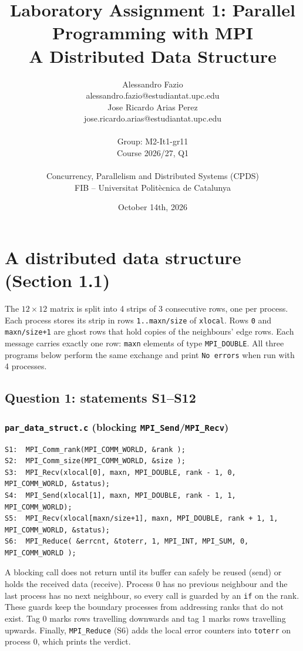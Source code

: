 \documentclass[11pt,a4paper]{article}
\title{Laboratory Assignment 1: Parallel Programming with MPI \\ A Distributed Data Structure}
\author{
  Alessandro Fazio \\
  alessandro.fazio@estudiantat.upc.edu \\
  Jose Ricardo Arias Perez \\
  jose.ricardo.arias@estudiantat.upc.edu \\\\
  Group: M2-It1-gr11 \\
  Course 2026/27, Q1 \\\\
  Concurrency, Parallelism and Distributed Systems (CPDS) \\
  FIB -- Universitat Polit\`ecnica de Catalunya
}
\date{October 14th, 2026}
\begin{document}
\maketitle
\thispagestyle{empty}
\newpage

\section{A distributed data structure (Section 1.1)}

The $12 \times 12$ matrix is split into 4 strips of 3 consecutive rows, one per process. Each process stores its strip in rows \texttt{1..maxn/size} of \texttt{xlocal}. Rows \texttt{0} and \texttt{maxn/size+1} are ghost rows that hold copies of the neighbours' edge rows. Each message carries exactly one row: \texttt{maxn} elements of type \texttt{MPI\_DOUBLE}. All three programs below perform the same exchange and print \texttt{No errors} when run with 4 processes.

\subsection*{Question 1: statements S1--S12}

\subsubsection*{\texttt{par\_data\_struct.c} (blocking \texttt{MPI\_Send}/\texttt{MPI\_Recv})}
\begin{lstlisting}
S1:  MPI_Comm_rank(MPI_COMM_WORLD, &rank );
S2:  MPI_Comm_size(MPI_COMM_WORLD, &size );
S3:  MPI_Recv(xlocal[0], maxn, MPI_DOUBLE, rank - 1, 0, MPI_COMM_WORLD, &status);
S4:  MPI_Send(xlocal[1], maxn, MPI_DOUBLE, rank - 1, 1, MPI_COMM_WORLD);
S5:  MPI_Recv(xlocal[maxn/size+1], maxn, MPI_DOUBLE, rank + 1, 1, MPI_COMM_WORLD, &status);
S6:  MPI_Reduce( &errcnt, &toterr, 1, MPI_INT, MPI_SUM, 0, MPI_COMM_WORLD );
\end{lstlisting}
A blocking call does not return until its buffer can safely be reused (send) or holds the received data (receive). Process 0 has no previous neighbour and the last process has no next neighbour, so every call is guarded by an \texttt{if} on the rank. These guards keep the boundary processes from addressing ranks that do not exist. Tag 0 marks rows travelling downwards and tag 1 marks rows travelling upwards. Finally, \texttt{MPI\_Reduce} (S6) adds the local error counters into \texttt{toterr} on process 0, which prints the verdict.
\end{document}
